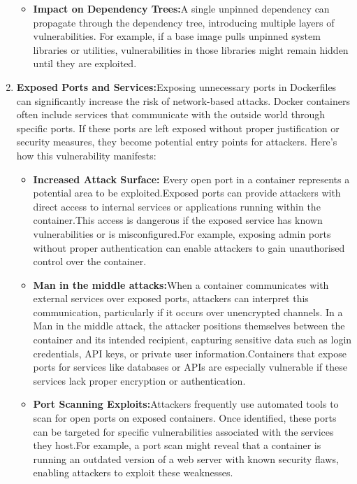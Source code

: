 \begin{enumerate}
\begin{itemize}
        \item \textbf{Impact on Dependency Trees:}A single unpinned dependency can propagate through the dependency tree, introducing multiple layers of vulnerabilities. For example, if a base image pulls unpinned system libraries or utilities, vulnerabilities in those libraries might remain hidden until they are exploited.
    \end{itemize}
    \item \textbf{Exposed Ports and Services:}Exposing unnecessary ports in Dockerfiles can significantly increase the risk of network-based attacks. Docker containers often include services that communicate with the outside world through specific ports. If these ports are left exposed without proper justification or security measures, they become potential entry points for attackers. Here’s how this vulnerability manifests\cite{Dockeranalysis}:
    \begin{itemize}
        \item \textbf{Increased Attack Surface:} Every open port in a container represents a potential area to be exploited.Exposed ports can provide attackers with direct access to internal services or applications running within the container.This access is dangerous if the exposed service has known vulnerabilities or is misconfigured.For example, exposing admin ports without proper authentication can enable attackers to gain unauthorised control over the container.
        \item \textbf{Man in the middle attacks:}When a container communicates with external services over exposed ports, attackers can interpret this communication, particularly if it occurs over unencrypted channels. In a Man in the middle attack, the attacker positions themselves between the container and its intended recipient, capturing sensitive data such as login credentials, API keys, or private user information.Containers that expose ports for services like databases or APIs are especially vulnerable if these services lack proper encryption or authentication.

        \item \textbf{Port Scanning Exploits:}Attackers frequently use automated tools to scan for open ports on exposed containers. Once identified, these ports can be targeted for specific vulnerabilities associated with the services they host.For example, a port scan might reveal that a container is running an outdated version of a web server with known security flaws, enabling attackers to exploit these weaknesses.

    \end{itemize}
\end{enumerate}

